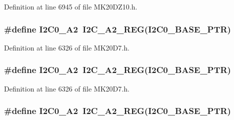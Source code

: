 Definition at line 6945 of file M\+K20\+D\+Z10.\+h.

\subsubsection[{\texorpdfstring{I2\+C0\+\_\+\+A2}{I2C0_A2}}]{\setlength{\rightskip}{0pt plus 5cm}\#define I2\+C0\+\_\+\+A2~{\bf I2\+C\+\_\+\+A2\+\_\+\+R\+EG}({\bf I2\+C0\+\_\+\+B\+A\+S\+E\+\_\+\+P\+TR})}\hypertarget{group___i2_c___register___accessor___macros_ga99708d179cf5e948315ac4ff5d8d0983}{}\label{group___i2_c___register___accessor___macros_ga99708d179cf5e948315ac4ff5d8d0983}


Definition at line 6326 of file M\+K20\+D7.\+h.

\subsubsection[{\texorpdfstring{I2\+C0\+\_\+\+A2}{I2C0_A2}}]{\setlength{\rightskip}{0pt plus 5cm}\#define I2\+C0\+\_\+\+A2~{\bf I2\+C\+\_\+\+A2\+\_\+\+R\+EG}({\bf I2\+C0\+\_\+\+B\+A\+S\+E\+\_\+\+P\+TR})}\hypertarget{group___i2_c___register___accessor___macros_ga99708d179cf5e948315ac4ff5d8d0983}{}\label{group___i2_c___register___accessor___macros_ga99708d179cf5e948315ac4ff5d8d0983}


Definition at line 6326 of file M\+K20\+D7.\+h.

\subsubsection[{\texorpdfstring{I2\+C0\+\_\+\+A2}{I2C0_A2}}]{\setlength{\rightskip}{0pt plus 5cm}\#define I2\+C0\+\_\+\+A2~{\bf I2\+C\+\_\+\+A2\+\_\+\+R\+EG}({\bf I2\+C0\+\_\+\+B\+A\+S\+E\+\_\+\+P\+TR})}\hypertarget{group___i2_c___register___accessor___macros_ga99708d179cf5e948315ac4ff5d8d0983}{}\label{group___i2_c___register___accessor___macros_ga99708d179cf5e948315ac4ff5d8d0983}


